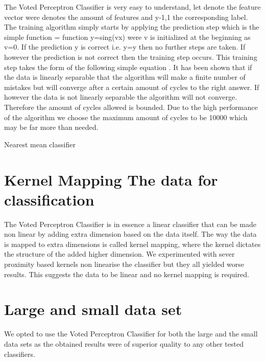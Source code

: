 \documentclass[%
        compressed,
        final,
        notitlepage,
        narroweqnarray,
        inline,
        twoside,
        ]{ieee}
\begin{document}
The Voted Perceptron Classifier is very easy to understand, let  denote the feature vector were   denotes the amount of features and y{-1,1} the corresponding label. The training algorithm simply starts by applying the prediction step which is the simple function = function y=sing(vx) were v is initialized at the beginning as v=0. If the prediction y is correct i.e. y=y then no further steps are taken. If however the prediction is not correct then the training step occurs. This training step takes the form of the following simple equation . It has been shown that if the data is linearly separable that the algorithm will make a finite number of mistakes but will converge after a certain amount of cycles to the right answer. If however the data is not linearly separable the algorithm will not converge. Therefore the amount of cycles allowed is bounded. Due to the high performance of the algorithm we choose the maximum amount of cycles to be 10000 which may be far more than needed.

Nearest mean classifier


\section{Kernel Mapping The data for classification}
The Voted Perceptron Classifier is in essence a linear classifier that can be made non linear by adding extra dimension based on the data itself. The way the data is mapped to extra dimensions is called kernel mapping, where the kernel dictates the structure of the added higher dimension. We experimented with sever proximity based kernels non linearise the classifier but they all yielded worse results. This suggests the data to be linear and no kernel mapping is required.

\section{Large and small data set}
We opted to use the Voted Perceptron Classifier for both the large and the small data sets as the obtained results were of superior quality to any other tested classifiers.
\end{document}
